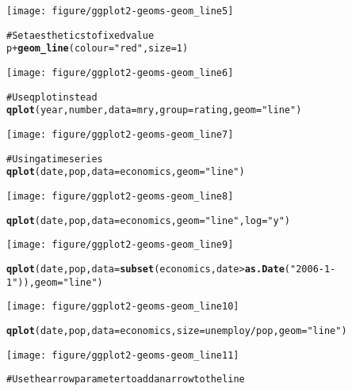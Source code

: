 \documentclass[a4paper,titlepage]{tufte-handout}\usepackage{graphicx, color}
\makeatletter
\def\maxwidth{ %
  \ifdim\Gin@nat@width>\linewidth
    \linewidth
  \else
    \Gin@nat@width
  \fi
}
\newcommand{\hlfunctioncall}[1]{\textcolor[rgb]{0.501960784313725,0,0.329411764705882}{\textbf{#1}}}%
\newcommand{\hlstring}[1]{\textcolor[rgb]{0.6,0.6,1}{#1}}%
\newcommand{\hlcomment}[1]{\textcolor[rgb]{0.180392156862745,0.6,0.341176470588235}{#1}}%
\newenvironment{kframe}{%
 \def\at@end@of@kframe{}%
 \ifinner\ifhmode%
  \def\at@end@of@kframe{\end{minipage}}%
  \begin{minipage}{\columnwidth}%
 \fi\fi%
 \def\FrameCommand##1{\hskip\@totalleftmargin \hskip-\fboxsep
 \colorbox{shadecolor}{##1}\hskip-\fboxsep
     \hskip-\linewidth \hskip-\@totalleftmargin \hskip\columnwidth}%
 \MakeFramed {\advance\hsize-\width
   \@totalleftmargin\z@ \linewidth\hsize
   \@setminipage}}%
 {\par\unskip\endMakeFramed%
 \at@end@of@kframe}
\newenvironment{knitrout}{}{} %
\makeatother
\begin{document}
\begin{knitrout}
\begin{kframe}
\end{kframe}\texttt{[image: figure/ggplot2-geoms-geom\_line5]} \begin{kframe}\begin{alltt}
\hlcomment{# Set aesthetics to fixed value}
p + \hlfunctioncall{geom_line}(colour = \hlstring{"red"}, size = 1)
\end{alltt}
\end{kframe}\texttt{[image: figure/ggplot2-geoms-geom\_line6]} \begin{kframe}\begin{alltt}
\hlcomment{# Use qplot instead}
\hlfunctioncall{qplot}(year, number, data=mry, group=rating, geom=\hlstring{"line"})
\end{alltt}
\end{kframe}\texttt{[image: figure/ggplot2-geoms-geom\_line7]} \begin{kframe}\begin{alltt}
\hlcomment{# Using a time series}
\hlfunctioncall{qplot}(date, pop, data=economics, geom=\hlstring{"line"})
\end{alltt}
\end{kframe}\texttt{[image: figure/ggplot2-geoms-geom\_line8]} \begin{kframe}\begin{alltt}
\hlfunctioncall{qplot}(date, pop, data=economics, geom=\hlstring{"line"}, log=\hlstring{"y"})
\end{alltt}
\end{kframe}\texttt{[image: figure/ggplot2-geoms-geom\_line9]} \begin{kframe}\begin{alltt}
\hlfunctioncall{qplot}(date, pop, data=\hlfunctioncall{subset}(economics, date > \hlfunctioncall{as.Date}(\hlstring{"2006-1-1"})), geom=\hlstring{"line"})
\end{alltt}
\end{kframe}\texttt{[image: figure/ggplot2-geoms-geom\_line10]} \begin{kframe}\begin{alltt}
\hlfunctioncall{qplot}(date, pop, data=economics, size=unemploy/pop, geom=\hlstring{"line"})
\end{alltt}
\end{kframe}\texttt{[image: figure/ggplot2-geoms-geom\_line11]} \begin{kframe}\begin{alltt}
\hlcomment{# Use the arrow parameter to add an arrow to the line}

\end{alltt}
\end{kframe}
\end{knitrout}
\end{document}
